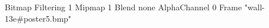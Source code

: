 {Bitmap
	{Filtering 1}
	{Mipmap 1}
	{Blend none}
	{AlphaChannel 0}
	{Frame "wall-13e#poster5.bmp"}
}
